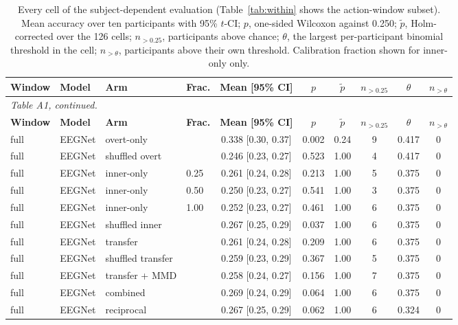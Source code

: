 \setlength{\tabcolsep}{3.5pt}
\setlength{\LTcapwidth}{\textwidth}
\begin{longtable}{llllcccccc}
\caption{Every cell of the subject-dependent evaluation (Table~\ref{tab:within} shows the action-window subset). Mean accuracy over ten participants with 95\% $t$-CI; $p$, one-sided Wilcoxon against 0.250; $\tilde{p}$, Holm-corrected over the 126 cells; $n_{>0.25}$, participants above chance; $\theta$, the largest per-participant binomial threshold in the cell; $n_{>\theta}$, participants above their own threshold. Calibration fraction shown for inner-only only.\label{tab:supp}}\\
\toprule
\textbf{Window} & \textbf{Model} & \textbf{Arm} & \textbf{Frac.} & \textbf{Mean [95\% CI]} & $p$ & $\tilde{p}$ & $n_{>0.25}$ & $\theta$ & $n_{>\theta}$ \\
\midrule
\endfirsthead
\multicolumn{10}{l}{\emph{Table A1, continued.}}\\
\toprule
\textbf{Window} & \textbf{Model} & \textbf{Arm} & \textbf{Frac.} & \textbf{Mean [95\% CI]} & $p$ & $\tilde{p}$ & $n_{>0.25}$ & $\theta$ & $n_{>\theta}$ \\
\midrule
\endhead
\bottomrule
\endlastfoot
full & EEGNet & overt-only &  & 0.338 [0.30, 0.37] & 0.002 & 0.24 & 9 & 0.417 & 0 \\
full & EEGNet & shuffled overt &  & 0.246 [0.23, 0.27] & 0.523 & 1.00 & 4 & 0.417 & 0 \\
full & EEGNet & inner-only & 0.25 & 0.261 [0.24, 0.28] & 0.213 & 1.00 & 5 & 0.375 & 0 \\
full & EEGNet & inner-only & 0.50 & 0.250 [0.23, 0.27] & 0.541 & 1.00 & 3 & 0.375 & 0 \\
full & EEGNet & inner-only & 1.00 & 0.252 [0.23, 0.27] & 0.461 & 1.00 & 6 & 0.375 & 0 \\
full & EEGNet & shuffled inner &  & 0.267 [0.25, 0.29] & 0.037 & 1.00 & 6 & 0.375 & 0 \\
full & EEGNet & transfer &  & 0.261 [0.24, 0.28] & 0.209 & 1.00 & 6 & 0.375 & 0 \\
full & EEGNet & shuffled transfer &  & 0.259 [0.23, 0.29] & 0.367 & 1.00 & 5 & 0.375 & 0 \\
full & EEGNet & transfer + MMD &  & 0.258 [0.24, 0.27] & 0.156 & 1.00 & 7 & 0.375 & 0 \\
full & EEGNet & combined &  & 0.269 [0.24, 0.29] & 0.064 & 1.00 & 6 & 0.375 & 0 \\
full & EEGNet & reciprocal &  & 0.267 [0.25, 0.29] & 0.062 & 1.00 & 6 & 0.324 & 0 \\

\end{longtable}
